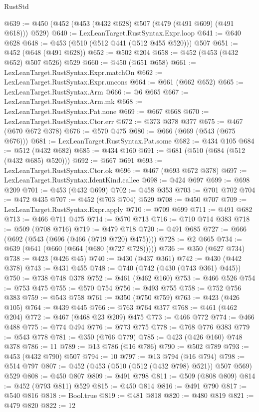 \begin{lexlean}{RustStd}
\begin{coremodule}
@639 := @450 (@452 (@453 (@432 @628) @507 (@479 (@491 @609) (@491 @618))) @529)
@640 := LexLeanTarget.RustSyntax.Expr.loop
@641 := @640 @628
@648 := @453 (@510 (@512 @441 (@512 @455 @520))) @507
@651 := @452 (@648 (@491 @628))
@652 := @502 @204
@658 := @452 (@453 (@432 @652) @507 @526) @529
@660 := @450 (@651 @658)
@661 := LexLeanTarget.RustSyntax.Expr.matchOn
@662 := LexLeanTarget.RustSyntax.Expr.uncons
@664 := @661 (@662 @652)
@665 := LexLeanTarget.RustSyntax.Arm
@666 := @6 @665
@667 := LexLeanTarget.RustSyntax.Arm.mk
@668 := LexLeanTarget.RustSyntax.Pat.none
@669 := @667 @668
@670 := LexLeanTarget.RustSyntax.Ctor.err
@672 := @373 @378 @377
@675 := @467 (@670 @672 @378)
@676 := @570 @475
@680 := @666 (@669 (@543 (@675 @676)))
@681 := LexLeanTarget.RustSyntax.Pat.some
@682 := @434 @105
@684 := @512 (@432 @682)
@685 := @434 @160
@691 := @681 (@510 (@684 (@512 (@432 @685) @520)))
@692 := @667 @691
@693 := LexLeanTarget.RustSyntax.Ctor.ok
@696 := @467 (@693 @672 @378)
@697 := LexLeanTarget.RustSyntax.IdentKind.callee
@698 := @424 @697
@699 := @698 @209
@701 := @453 (@432 @699)
@702 := @458 @353
@703 := @701 @702
@704 := @472 @435
@707 := @452 (@703 @704) @529
@708 := @450 @707
@709 := LexLeanTarget.RustSyntax.Expr.apply
@710 := @709 @699
@711 := @491 @682
@713 := @466 @711 @475
@714 := @570 @713
@716 := @710 @714 @383
@718 := @509 (@708 @716)
@719 := @479 @718
@720 := @491 @685
@727 := @666 (@692 (@543 (@696 (@466 (@719 @720) @475))))
@728 := @2 @665
@734 := @639 (@641 (@660 (@664 (@680 (@727 @728)))))
@736 := @350 (@627 @734)
@738 := @423 (@426 @45)
@740 := @430 (@437 @361)
@742 := @430 (@442 @378)
@743 := @431 @455
@748 := @740 (@742 (@430 (@743 @361) @445))
@750 := @738 @748 @378
@752 := @461 (@462 @160)
@753 := @466 @526
@754 := @753 @475
@755 := @570 @754
@756 := @493 @755
@758 := @752 @756 @383
@759 := @543 @758
@761 := @350 (@750 @759)
@763 := @423 (@426 @105)
@764 := @439 @445
@766 := @763 @764 @377
@768 := @461 (@462 @204)
@772 := @467 (@468 @23 @209) @475
@773 := @466 @772
@774 := @466 @488
@775 := @774 @494
@776 := @773 @775
@778 := @768 @776 @383
@779 := @543 @778
@781 := @350 (@766 @779)
@785 := @423 (@426 @160) @748 @378
@786 := 11
@789 := @13 @786 (@16 @786)
@790 := @502 @789
@793 := @453 (@432 @790) @507
@794 := 10
@797 := @13 @794 (@16 @794)
@798 := @514 @797
@807 := @452 (@453 (@510 (@512 (@432 @798) @521)) @507 @569) @529
@808 := @450 @807
@809 := @491 @798
@811 := @509 (@808 @809)
@814 := @452 (@793 @811) @529
@815 := @450 @814
@816 := @491 @790
@817 := @540 @816
@818 := Bool.true
@819 := @481 @818
@820 := @480 @819
@821 := @479 @820
@822 := 12

\end{coremodule}
\end{lexlean}
